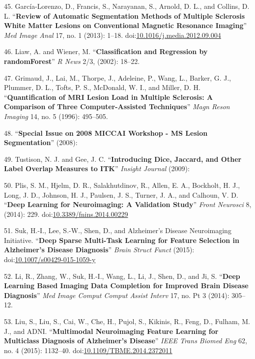 \documentclass[11pt,]{article}
\begin{document}
\hypertarget{ref-Garcia-Lorenzo:2013aa}{}
45. García-Lorenzo, D., Francis, S., Narayanan, S., Arnold, D. L., and
Collins, D. L. ``\textbf{Review of Automatic Segmentation Methods of
Multiple Sclerosis White Matter Lesions on Conventional Magnetic
Resonance Imaging}'' \emph{Med Image Anal} 17, no. 1 (2013): 1--18.
doi:\href{https://doi.org/10.1016/j.media.2012.09.004}{10.1016/j.media.2012.09.004}

\hypertarget{ref-liaw2002}{}
46. Liaw, A. and Wiener, M. ``\textbf{Classification and Regression by
randomForest}'' \emph{R News} 2/3, (2002): 18--22.

\hypertarget{ref-Grimaud:1996aa}{}
47. Grimaud, J., Lai, M., Thorpe, J., Adeleine, P., Wang, L., Barker, G.
J., Plummer, D. L., Tofts, P. S., McDonald, W. I., and Miller, D. H.
``\textbf{Quantification of MRI Lesion Load in Multiple Sclerosis: A
Comparison of Three Computer-Assisted Techniques}'' \emph{Magn Reson
Imaging} 14, no. 5 (1996): 495--505.

\hypertarget{ref-styner2008}{}
48. ``\textbf{Special Issue on 2008 MICCAI Workshop - MS Lesion
Segmentation}'' (2008):

\hypertarget{ref-tustison2009}{}
49. Tustison, N. J. and Gee, J. C. ``\textbf{Introducing Dice, Jaccard,
and Other Label Overlap Measures to ITK}'' \emph{Insight Journal}
(2009):

\hypertarget{ref-Plis:2014aa}{}
50. Plis, S. M., Hjelm, D. R., Salakhutdinov, R., Allen, E. A.,
Bockholt, H. J., Long, J. D., Johnson, H. J., Paulsen, J. S., Turner, J.
A., and Calhoun, V. D. ``\textbf{Deep Learning for Neuroimaging: A
Validation Study}'' \emph{Front Neurosci} 8, (2014): 229.
doi:\href{https://doi.org/10.3389/fnins.2014.00229}{10.3389/fnins.2014.00229}

\hypertarget{ref-Suk:2015aa}{}
51. Suk, H.-I., Lee, S.-W., Shen, D., and Alzheimer's Disease
Neuroimaging Initiative. ``\textbf{Deep Sparse Multi-Task Learning for
Feature Selection in Alzheimer's Disease Diagnosis}'' \emph{Brain Struct
Funct} (2015):
doi:\href{https://doi.org/10.1007/s00429-015-1059-y}{10.1007/s00429-015-1059-y}

\hypertarget{ref-Li:2014aa}{}
52. Li, R., Zhang, W., Suk, H.-I., Wang, L., Li, J., Shen, D., and Ji,
S. ``\textbf{Deep Learning Based Imaging Data Completion for Improved
Brain Disease Diagnosis}'' \emph{Med Image Comput Comput Assist Interv}
17, no. Pt 3 (2014): 305--12.

\hypertarget{ref-Liu:2015aa}{}
53. Liu, S., Liu, S., Cai, W., Che, H., Pujol, S., Kikinis, R., Feng,
D., Fulham, M. J., and ADNI. ``\textbf{Multimodal Neuroimaging Feature
Learning for Multiclass Diagnosis of Alzheimer's Disease}'' \emph{IEEE
Trans Biomed Eng} 62, no. 4 (2015): 1132--40.
doi:\href{https://doi.org/10.1109/TBME.2014.2372011}{10.1109/TBME.2014.2372011}
\end{document}
